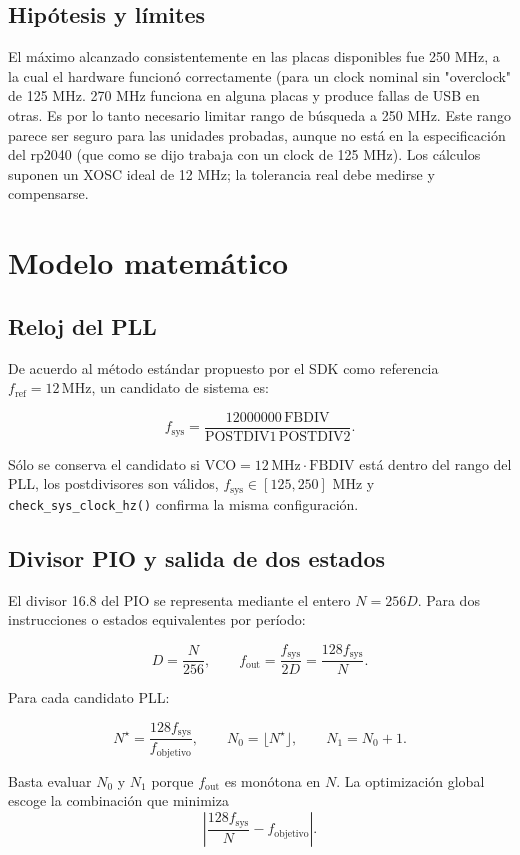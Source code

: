 \documentclass[10pt,a4paper]{article}
\newcommand{\num}[1]{#1}
\newcommand{\SI}[2]{#1\,\ensuremath{\mathrm{#2}}}
\newcommand{\mega}{M}
\newcommand{\hertz}{Hz}
\begin{document}
\subsection{Hipótesis  y límites}
El máximo alcanzado consistentemente en las placas disponibles fue 250 MHz,
a la cual el hardware funcionó correctamente (para un clock nominal sin "overclock" 
de 125 MHz. 270 MHz funciona en alguna placas y produce fallas de USB en otras.
Es por lo tanto necesario limitar rango de búsqueda a 250 MHz.
Este rango parece ser seguro para las unidades probadas, aunque no está en la 
especificación del rp2040 (que como se dijo trabaja con un clock de 125 MHz).
Los cálculos suponen un XOSC ideal de 12 MHz; la tolerancia real debe medirse y compensarse.

\clearpage
\section{Modelo matemático}
\subsection{Reloj del PLL}
De acuerdo al método estándar propuesto por el  SDK como referencia
\(f_{\mathrm{ref}}=\SI{12}{\mega\hertz}\), un candidato de sistema es:
\begin{technicalbox}
\[
 f_{\mathrm{sys}}=
 \frac{\num{12000000}\,\mathrm{FBDIV}}
 {\mathrm{POSTDIV1}\,\mathrm{POSTDIV2}}.
\]
\end{technicalbox}
Sólo se conserva el candidato si
\(\mathrm{VCO}=\SI{12}{\mega\hertz}\cdot\mathrm{FBDIV}\) está dentro del
rango del PLL, los postdivisores son válidos,
\(f_{\mathrm{sys}}\in[125,250]\) MHz y
\texttt{check\_sys\_clock\_hz()} confirma la misma configuración.

\subsection{Divisor PIO y salida de dos estados}
El divisor 16.8 del PIO se representa mediante el entero \(N=256D\). Para dos
instrucciones o estados equivalentes por período:
\begin{technicalbox}
\[
 D=\frac{N}{256},\qquad
 f_{\mathrm{out}}=\frac{f_{\mathrm{sys}}}{2D}
                  =\frac{128f_{\mathrm{sys}}}{N}.
\]
\end{technicalbox}
Para cada candidato PLL:
\begin{technicalbox}
\[
 N^\star=\frac{128f_{\mathrm{sys}}}{f_{\mathrm{objetivo}}},
 \qquad N_0=\lfloor N^\star\rfloor,\qquad N_1=N_0+1.
\]
\end{technicalbox}
Basta evaluar \(N_0\) y \(N_1\) porque \(f_{\mathrm{out}}\) es monótona en
\(N\). La optimización global escoge la combinación que minimiza
\[
 \left|\frac{128f_{\mathrm{sys}}}{N}-f_{\mathrm{objetivo}}\right|.
\]
\end{document}
